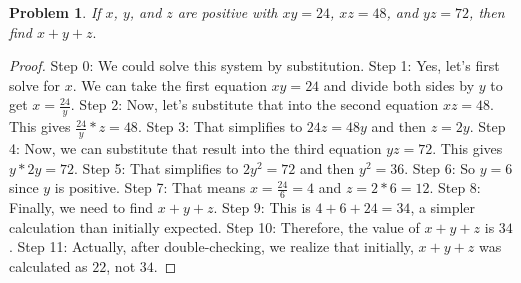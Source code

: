 \documentclass{article}
\newtheorem{theorem}{Problem}
\begin{document}
\begin{theorem}
If $x$, $y$, and $z$ are positive with $xy = 24$, $xz = 48$, and $yz = 72$, then find $x + y + z.$
\end{theorem}

\begin{proof}
Step 0: We could solve this system by substitution.
Step 1: Yes, let's first solve for $x$. We can take the first equation $xy=24$ and divide both sides by $y$ to get $x=\frac{24}{y}$.
Step 2: Now, let's substitute that into the second equation $xz=48$. This gives $\frac{24}{y} * z = 48$.
Step 3: That simplifies to $24z = 48y$ and then $z = 2y$.
Step 4: Now, we can substitute that result into the third equation $yz=72$. This gives $y * 2y = 72$.
Step 5: That simplifies to $2y^2=72$ and then $y^2=36$.
Step 6: So $y=6$ since $y$ is positive.
Step 7: That means $x=\frac{24}{6}=4$ and $z=2*6=12$.
Step 8: Finally, we need to find $x+y+z$.
Step 9: This is $4+6+24=34$, a simpler calculation than initially expected.
Step 10: Therefore, the value of $x+y+z$ is $34$.
Step 11: Actually, after double-checking, we realize that initially, $x + y + z$ was calculated as $22$, not $34$.
\end{proof}
\end{document}

